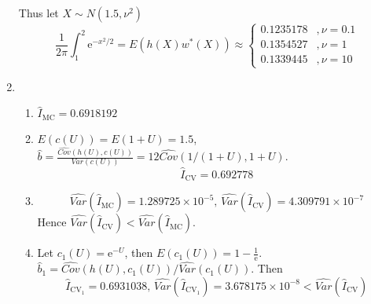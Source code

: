\documentclass{article}
\begin{document}
\begin{enumerate}[leftmargin = 0 em, label = \arabic*., font = \bfseries]
	Thus let $X \sim N( 1.5, \nu^2)$
	\[\frac{1}{2 \pi}\int_{1}^2 \mathrm{e}^{-x^2/2} = E\left( h(X) w^* (X)\right) \approx \begin{cases}
		0.1235178 & , \nu = 0.1\\
		0.1354527 & , \nu = 1\\
		0.1339445 & , \nu = 10
	\end{cases}\]

	
	
	
	\item 
	\begin{enumerate}
		\item 
		$\hat{I}_{\mathrm{MC}} = 0.6918192$

		\item 
		$E(c(U)) = E(1 + U) = 1.5$, $\hat{b} = \frac{\widehat{Cov}(h(U), c(U))}{{Var}(c(U))} = 12 \widehat{Cov}(1/(1+U), 1 + U).$
		\[\hat{I}_{\mathrm{CV}} = 0.692778\]

		\item 
		\[\widehat{Var}(\hat{I}_{\mathrm{MC}}) = 1.289725 \times 10^{-5},\, \widehat{Var}({\hat{I}_{\mathrm{CV}}}) = 4.309791 \times 10^{-7} \]
		Hence $\widehat{Var}({\hat{I}_{\mathrm{CV}}}) < \widehat{Var}(\hat{I}_{\mathrm{MC}})$.

		\item 
		Let $c_1(U) = \mathrm{e}^{-U}$, then $E(c_1(U)) = 1 - \frac{1}{\mathrm{e}}$. $\hat{b}_{1} = \widehat{Cov}(h(U), c_1(U))/\widehat{Var}(c_1(U))$. Then
		\[\hat{I}_{\mathrm{CV}_1} = 0.6931038,\, \widehat{Var}(\hat{I}_{\mathrm{CV}_1}) = 3.678175 \times 10^{-8} < \widehat{Var}(\hat{I}_{\mathrm{CV}})\]

	\end{enumerate}	
	
	
 	\end{enumerate}
	
	
\end{document}
